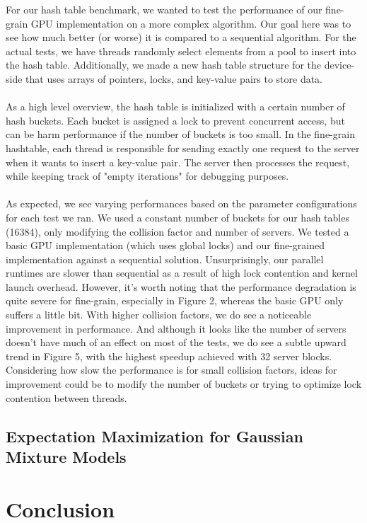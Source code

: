 \documentclass{article}
\begin{document}
For our hash table benchmark, we wanted to test the performance of our fine-grain
GPU implementation on a more complex algorithm. Our goal here was to see how much 
better (or worse) it is compared to a sequential algorithm. For the actual tests,
we have threads randomly select elements from a pool to insert into the hash table.
Additionally, we made a new hash table structure for the device-side that uses
arrays of pointers, locks, and key-value pairs to store data. 
\\
\\
As a high level overview, the hash table is initialized with a certain number of
hash buckets. Each bucket is assigned a lock to prevent concurrent access, but 
can be harm performance if the number of buckets is too small. In the fine-grain
hashtable, each thread is responsible for sending exactly one request to the 
server when it wants to insert a key-value pair. The server then processes the
request, while keeping track of "empty iterations" for debugging purposes.
\\
\\
As expected, we see varying performances based on the parameter configurations
for each test we ran. We used a constant number of buckets for our hash tables
(16384), only modifying the collision factor and number of servers. We tested
a basic GPU implementation (which uses global locks) and our fine-grained 
implementation against a sequential solution. Unsurprisingly, our parallel 
runtimes are slower than sequential as a result of high lock contention and
kernel launch overhead. However, it's worth noting that the performance 
degradation is quite severe for fine-grain, especially in Figure 2, whereas the
basic GPU only suffers a little bit. With higher collision factors, we do see 
a noticeable improvement in performance. And although it looks like the number 
of servers doesn't have much of an effect on most of the tests, we do see a 
subtle upward trend in Figure 5, with the highest speedup achieved with 32
server blocks. Considering how slow the performance is for small collision 
factors, ideas for improvement could be to modify the number of buckets or 
trying to optimize lock contention between threads.

\subsection{Expectation Maximization for Gaussian Mixture Models}


\section{Conclusion}

\newpage
\printbibliography
\end{document}
